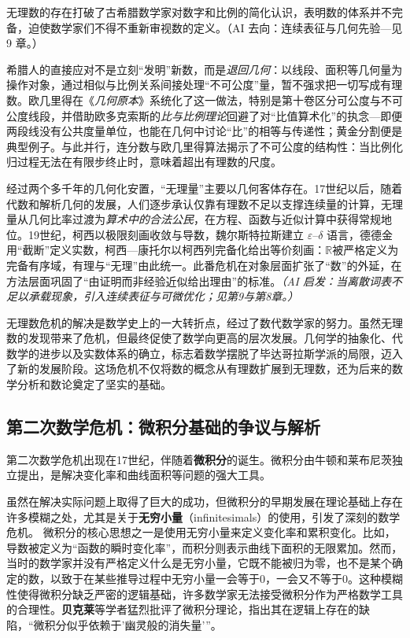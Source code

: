 无理数的存在打破了古希腊数学家对数字和比例的简化认识，表明数的体系并不完备，迫使数学家们不得不重新审视数的定义。{（AI 去向：连续表征与几何先验—见 9 章。）}

希腊人的直接应对不是立刻“发明”新数，而是{\itshape 退回几何}：以线段、面积等几何量为操作对象，通过相似与比例关系间接处理“不可公度”量，暂不强求把一切写成有理数。欧几里得在《\emph{几何原本}》系统化了这一做法，特别是第十卷区分可公度与不可公度线段，并借助欧多克索斯的{\itshape 比与比例理论}回避了对“比值算术化”的执念---即便两段线没有公共度量单位，也能在几何中讨论“比”的相等与传递性；黄金分割便是典型例子。与此并行，连分数与欧几里得算法揭示了不可公度的结构性：当比例化归过程无法在有限步终止时，意味着超出有理数的尺度。

经过两个多千年的几何化安置，“无理量”主要以几何客体存在。17世纪以后，随着代数和解析几何的发展，人们逐步承认仅靠有理数不足以支撑连续量的计算，无理量从几何比率过渡为{\itshape 算术中的合法公民}，在方程、函数与近似计算中获得常规地位。19世纪，柯西以极限刻画收敛与导数，魏尔斯特拉斯建立 $\varepsilon$–$\delta$ 语言，德德金用“截断”定义实数，柯西—康托尔以柯西列完备化给出等价刻画：$\mathbb{R}$被严格定义为完备有序域，有理与“无理”由此统一。此番危机在对象层面扩张了“数”的外延，在方法层面巩固了“由证明而非经验近似给出理由”的标准。{\itshape（AI 启发：当离散词表不足以承载现象，引入连续表征与可微优化；见第9与第8章。）}

无理数危机的解决是数学史上的一大转折点，经过了数代数学家的努力。虽然无理数的发现带来了危机，但最终促使了数学向更高的层次发展。几何学的抽象化、代数学的进步以及实数体系的确立，标志着数学摆脱了毕达哥拉斯学派的局限，迈入了新的发展阶段。这场危机不仅将数的概念从有理数扩展到无理数，还为后来的数学分析和数论奠定了坚实的基础。

\subsection{第二次数学危机：微积分基础的争议与解析}
第二次数学危机出现在17世纪，伴随着{\bf 微积分}的诞生。微积分由牛顿和莱布尼茨独立提出，是解决变化率和曲线面积等问题的强大工具。

虽然在解决实际问题上取得了巨大的成功，但微积分的早期发展在理论基础上存在许多模糊之处，尤其是关于{\bf 无穷小量}（infinitesimals）的使用，引发了深刻的数学危机。
微积分的核心思想之一是使用无穷小量来定义变化率和累积变化。比如，导数被定义为“函数的瞬时变化率”，而积分则表示曲线下面积的无限累加。然而，当时的数学家并没有严格定义什么是无穷小量，它既不能被归为零，也不是某个确定的数，以致于在某些推导过程中无穷小量一会等于0，一会又不等于0。这种模糊性使得微积分缺乏严密的逻辑基础，许多数学家无法接受微积分作为严格数学工具的合理性。{\bf 贝克莱}等学者猛烈批评了微积分理论，指出其在逻辑上存在的缺陷，“微积分似乎依赖于'幽灵般的消失量'”。

